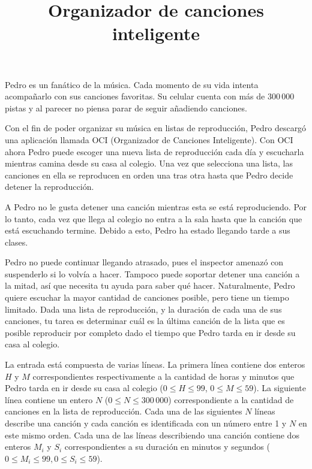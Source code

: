 \documentclass{oci}
\title{Organizador de canciones inteligente}
\begin{document}
\begin{problemDescription}
Pedro es un fanático de la música.
Cada momento de su vida intenta acompañarlo con sus canciones favoritas.
Su celular cuenta con más de 300\,000 pistas y al parecer no piensa parar de
seguir añadiendo canciones.

Con el fin de poder organizar su música en listas de reproducción, Pedro
descargó una aplicación llamada OCI (Organizador de Canciones Inteligente).
Con OCI ahora Pedro puede escoger una nueva lista de reproducción cada día y
escucharla mientras camina desde su casa al colegio.
Una vez que selecciona una lista, las canciones en ella se reproducen en orden
una tras otra hasta que Pedro decide detener la reproducción.

A Pedro no le gusta detener una canción mientras esta se está reproduciendo.
Por lo tanto, cada vez que llega al colegio no entra a la sala hasta que la
canción que está escuchando termine.
Debido a esto, Pedro ha estado llegando tarde a sus clases.

Pedro no puede continuar llegando atrasado, pues el inspector amenazó
con suspenderlo si lo volvía a hacer.
Tampoco puede soportar detener una canción a la mitad, así que necesita tu ayuda
para saber qué hacer.
Naturalmente, Pedro quiere escuchar la mayor cantidad de canciones posible,
pero tiene un tiempo limitado.
Dada una lista de reproducción, y la duración de cada una de sus canciones, tu
tarea es determinar cuál es la última canción de la lista que es posible
reproducir por completo dado el tiempo que Pedro tarda en ir desde su casa al
colegio.

\end{problemDescription}

\begin{inputDescription}
  La entrada está compuesta de varias líneas.
  La primera línea contiene dos enteros $H$ y $M$ correspondientes
  respectivamente a la cantidad de horas y minutos que Pedro tarda en ir desde su
  casa al colegio ($0\leq H\leq 99$, $0\leq M\leq 59$).
  La siguiente línea contiene un entero $N$ ($0\leq N\leq 300\,000$)
  correspondiente a la cantidad de canciones en la lista de reproducción.
  Cada una de las siguientes $N$ líneas describe una canción y cada canción es
  identificada con un número entre 1 y $N$ en este mismo orden.
  Cada una de las líneas describiendo una canción contiene dos enteros $M_i$ y $S_i$
  correspondientes a su duración en minutos y segundos ($0\leq
  M_i\leq 99, 0\leq S_i\leq 59$).
\end{inputDescription}
\end{document}
